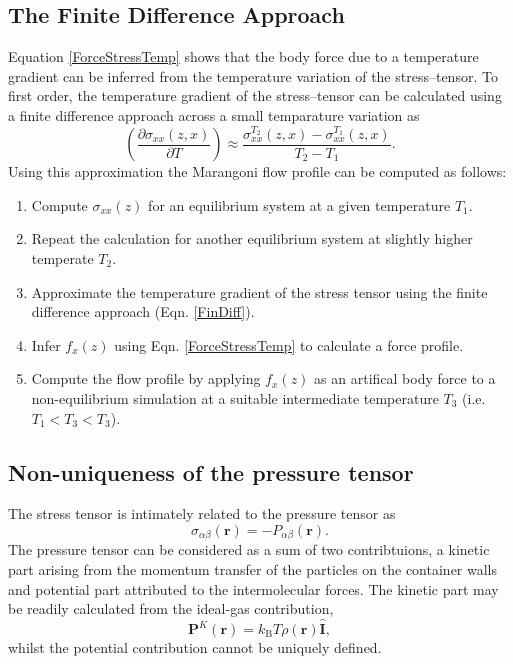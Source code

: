 \subsection{The Finite Difference Approach}
Equation \ref{ForceStressTemp} shows that the body force due to a temperature gradient can be inferred from the temperature variation of the stress--tensor. 
To first order, the temperature gradient of the stress--tensor can be calculated using a finite difference approach across a small temparature variation as
\begin{equation}
\label{FinDiff}
\left( \frac{\partial \sigma_{xx}(z,x)}{\partial T} \right) \approx \frac{\sigma_{xx}^{T_{2}}(z,x) - \sigma_{xx}^{T_{1}}(z,x)}{T_{2} - T_{1}}.
\end{equation}
Using this approximation the Marangoni flow profile can be computed as follows:
\begin{enumerate}
	\item Compute $\sigma_{xx}(z)$ for an equilibrium system at a given temperature $T_{1}$.
	\item Repeat the calculation for another equilibrium system at slightly higher temperate $T_{2}$.
	\item Approximate the temperature gradient of the stress tensor using the finite difference approach (Eqn. \ref{FinDiff}).
	\item Infer $f_{x}(z)$ using Eqn. \ref{ForceStressTemp} to calculate a force profile.
	\item Compute the flow profile by applying $f_{x}(z)$ as an artifical body force to a non-equilibrium simulation at a suitable intermediate temperature $T_{3}$ (i.e. $T_{1} < T_{3} < T_{3}$).
\end{enumerate}

\subsection{Non-uniqueness of the pressure tensor}
The stress tensor is intimately related to the pressure tensor as
\begin{equation}
\sigma_{\alpha \beta}(\mathbf{r}) = - P_{\alpha \beta} (\mathbf{r}).
\end{equation}
The pressure tensor can be considered as a sum of two contribtuions, a kinetic part arising from the momentum transfer of the particles on the container walls and potential part attributed to the intermolecular forces.\cite{VarnikBinder}
The kinetic part may be readily calculated from the ideal-gas contribution,
\begin{equation}
\mathbf{P}^{K}(\mathbf{r})=k_{\mathrm{B}} T \rho(\mathbf{r}) \hat{\mathbf{I}},
\end{equation}
whilst the potential contribution cannot be uniquely defined.

